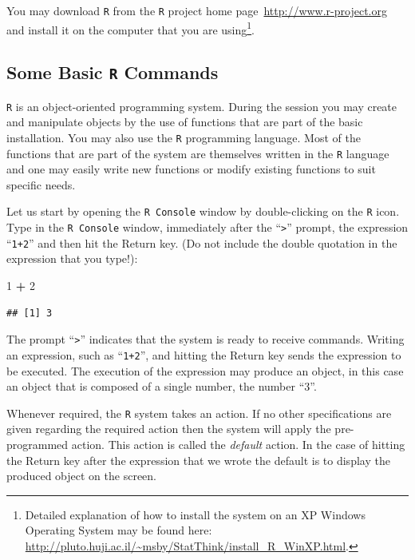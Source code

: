 \documentclass[]{krantz}
\makeatletter
\newenvironment{Shaded}{\begin{snugshade}}{\end{snugshade}}
\newcommand{\DecValTok}[1]{\textcolor[rgb]{0.00,0.00,0.81}{#1}}
\newcommand{\StringTok}[1]{\textcolor[rgb]{0.31,0.60,0.02}{#1}}
\newcommand{\OperatorTok}[1]{\textcolor[rgb]{0.81,0.36,0.00}{\textbf{#1}}}
\newenvironment{kframe}{%
\medskip{}
\setlength{\fboxsep}{.8em}
 \def\at@end@of@kframe{}%
 \ifinner\ifhmode%
  \def\at@end@of@kframe{\end{minipage}}%
  \begin{minipage}{\columnwidth}%
 \fi\fi%
 \def\FrameCommand##1{\hskip\@totalleftmargin \hskip-\fboxsep
 \colorbox{shadecolor}{##1}\hskip-\fboxsep
     \hskip-\linewidth \hskip-\@totalleftmargin \hskip\columnwidth}%
 \MakeFramed {\advance\hsize-\width
   \@totalleftmargin\z@ \linewidth\hsize
   \@setminipage}}%
 {\par\unskip\endMakeFramed%
 \at@end@of@kframe}
\renewenvironment{Shaded}{\begin{kframe}}{\end{kframe}}
\theoremstyle{definition}
\theoremstyle{definition}
\theoremstyle{definition}
\theoremstyle{remark}
\makeatother
\begin{document}
You may download \texttt{R} from the \texttt{R} project home
page~\url{http://www.r-project.org} and install it on the computer that
you are using\footnote{Detailed explanation of how to install the system
  on an XP Windows Operating System may be found here:
  \url{http://pluto.huji.ac.il/~msby/StatThink/install_R_WinXP.html}.}.

\subsection{\texorpdfstring{Some Basic \texttt{R}
Commands}{Some Basic R Commands}}\label{some-basic-r-commands}

\texttt{R} is an object-oriented programming system. During the session
you may create and manipulate objects by the use of functions that are
part of the basic installation. You may also use the \texttt{R}
programming language. Most of the functions that are part of the system
are themselves written in the \texttt{R} language and one may easily
write new functions or modify existing functions to suit specific needs.

Let us start by opening the \texttt{R\ Console} window by
double-clicking on the \texttt{R} icon. Type in the \texttt{R\ Console}
window, immediately after the ``\texttt{\textgreater{}}'' prompt, the
expression ``\texttt{1+2}'' and then hit the Return key. (Do not include
the double quotation in the expression that you type!):

\begin{Shaded}
\begin{Highlighting}[]
\DecValTok{1} \OperatorTok{+}\StringTok{ }\DecValTok{2}
\end{Highlighting}
\end{Shaded}

\begin{verbatim}
## [1] 3
\end{verbatim}

The prompt ``\texttt{\textgreater{}}'' indicates that the system is
ready to receive commands. Writing an expression, such as
``\texttt{1+2}'', and hitting the Return key sends the expression to be
executed. The execution of the expression may produce an object, in this
case an object that is composed of a single number, the number ``3''.

Whenever required, the \texttt{R} system takes an action. If no other
specifications are given regarding the required action then the system
will apply the pre-programmed action. This action is called the
\emph{default} action. In the case of hitting the Return key after the
expression that we wrote the default is to display the produced object
on the screen.
\end{document}
